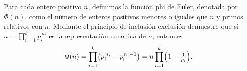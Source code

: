 Para cada entero positivo $n$, definimos la función phi de Euler, denotada por $\Phi(n)$, como el número de enteros positivos menores o iguales que $n$ y primos relativos con $n$. Mediante el principio de inclusión-exclusión demuestre que si $n = \prod_{i=1}^{k} p_i^{\,n_i}$ es la representación canónica de $n$, entonces
\[\Phi(n)=\prod_{i=1}^{k}\bigl(p_i^{\,n_i}-p_i^{\,n_i-1}\bigr)=n\prod_{i=1}^{k}\Bigl(1-\tfrac1{p_i}\Bigr).\]
